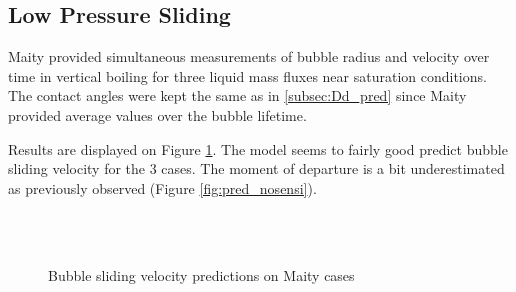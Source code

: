\subsection{Low Pressure Sliding}

Maity \cite{maity_effect_2000} provided simultaneous measurements of bubble radius and velocity over time in vertical boiling for three liquid mass fluxes near saturation conditions. The contact angles were kept the same as in \ref{subsec:Dd_pred} since Maity provided average values over the bubble lifetime.

\npar

Results are displayed on Figure \ref{fig:slide_maity}. The model seems to fairly good predict bubble sliding velocity for the 3 cases. The moment of departure is a bit underestimated as previously observed (Figure \ref{fig:pred_nosensi}).

\begin{figure}[h!]
\begin{center}
\\
\\
	\caption{Bubble sliding velocity predictions on Maity cases}
	\label{fig:slide_maity}
\end{center}
\end{figure}

